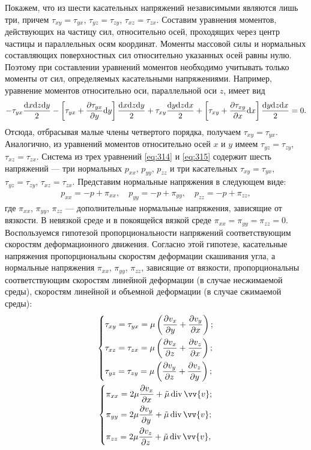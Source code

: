 	Покажем, что из шести касательных напряжений независимыми являются лишь три, причем $\tau_{xy} = \tau_{yx}$, $\tau_{yz} = \tau_{zy}$, $\tau_{xz} = \tau_{zx}$. Составим уравнения моментов, действующих на частицу сил, относительно осей, проходящих через центр частицы и параллельных осям координат. Моменты массовой силы и нормальных составляющих поверхностных сил относительно указанных осей равны нулю. Поэтому при составлении уравнений моментов необходимо учитывать только моменты от сил, определяемых касательными напряжениями. Например, уравнение моментов относительно оси, параллельной оси $z$, имеет вид
	\begin{gather*}
		-\tau_{yx}\frac{\mathrm{d} x\mathrm{d} z\mathrm{d} y}{2} - \left[\tau_{yx} + \frac{\partial \tau_{yx}}{\partial y}\mathrm{d} y\right]\frac{\mathrm{d} x\mathrm{d} z\mathrm{d} y}{2} + \tau_{xy}\frac{\mathrm{d} y\mathrm{d} z\mathrm{d} x}{2} + \left[\tau_{xy} + \frac{\partial \tau_{xy}}{\partial x}\mathrm{d} x\right]\frac{\mathrm{d} y\mathrm{d} z\mathrm{d} x}{2} = 0.
	\end{gather*}\n
	Отсюда, отбрасывая малые члены четвертого порядка, получаем $\tau_{xy} = \tau_{yx}$. Аналогично, из уравнений моментов относительно осей $x$ и $y$ имеем $\tau_{yz} = \tau_{zy}$, $\tau_{xz} = \tau_{zx}$. Система из трех уравнений \eqref{eq:314} и \eqref{eq:315} содержит шесть напряжений --- три нормальных $p_{xx}$, $p_{yy}$, $p_{zz}$ и три касательных $\tau_{xy} = \tau_{yx}$, $\tau_{yz} = \tau_{zy}$, $\tau_{xz} = \tau_{zx}$.\n
	Представим нормальные напряжения в следующем виде:
	\begin{gather}
		p_{xx} = -p + \pi_{xx}, \quad p_{yy} = -p + \pi_{yy}, \quad p_{zz} = -p + \pi_{zz},\label{eq:316}
	\end{gather}
	где $\pi_{xx}$, $\pi_{yy}$, $\pi_{zz}$ --- дополнительные нормальные напряжения, зависящие от вязкости. В невязкой среде и в покоящейся вязкой среде $\pi_{xx} = \pi_{yy} = \pi_{zz} = 0$.\n
	Воспользуемся гипотезой пропорциональности напряжений соответствующим скоростям деформационного движения. Согласно этой гипотезе, касательные напряжения пропорциональны скоростям деформации скашивания угла, а нормальные напряжения $\pi_{xx}$, $\pi_{yy}$, $\pi_{zz}$, зависящие от вязкости, пропорциональны соответствующим скоростям линейной деформации (в случае несжимаемой среды), скоростям линейной и объемной деформации (в случае сжимаемой среды):
	\begin{gather}
		\begin{dcases}\label{eq:317}
			\tau_{xy} = \tau_{yx} = \mu\left(\frac{\pp v_x}{\pp y} + \frac{\pp v_y}{\pp x}\right);\\
			\tau_{xz} = \tau_{zx} = \mu\left(\frac{\pp v_x}{\pp z} + \frac{\pp v_z}{\pp x}\right);\\
			\tau_{yz} = \tau_{zy} = \mu\left(\frac{\pp v_y}{\pp z} + \frac{\pp v_z}{\pp y}\right);
		\end{dcases}\\
		\begin{dcases}\label{eq:318}
			\pi_{xx} = 2\mu\frac{\pp v_x}{\pp x} + \tilde{\mu}\diverg{\vv{v}};\\
			\pi_{yy} = 2\mu\frac{\pp v_y}{\pp y} + \tilde{\mu}\diverg{\vv{v}};\\
			\pi_{zz} = 2\mu\frac{\pp v_z}{\pp z} + \tilde{\mu}\diverg{\vv{v}},
		\end{dcases}
	\end{gather}
